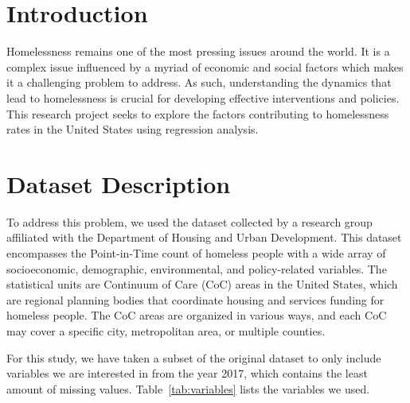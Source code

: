 \documentclass[12pt]{article}
\begin{document}
\section{Introduction}

Homelessness remains one of the most pressing issues around the world. It is a complex issue influenced by a myriad of economic and social factors which makes it a challenging problem to address. As such, understanding the dynamics that lead to homelessness is crucial for developing effective interventions and policies. This research project seeks to explore the factors contributing to homelessness rates in the United States using regression analysis. 

\section{Dataset Description}

To address this problem, we used the dataset \cite{nisar_2019_market} collected by a research group affiliated with the Department of Housing and Urban Development. This dataset encompasses the Point-in-Time count of homeless people with a wide array of socioeconomic, demographic, environmental, and policy-related variables. The statistical units are Continuum of Care (CoC) areas in the United States, which are regional planning bodies that coordinate housing and services funding for homeless people. The CoC areas are organized in various ways, and each CoC may cover a specific city, metropolitan area, or multiple counties.

For this study, we have taken a subset of the original dataset to only include variables we are interested in from the year 2017, which contains the least amount of missing values. Table~\ref{tab:variables} lists the variables we used.
\end{document}
